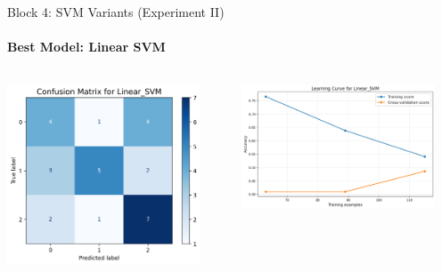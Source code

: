 \documentclass[9pt]{beamer}
\begin{document}
    \begin{frame}{Block 4: SVM Variants (Experiment II)}
    \framesubtitle{Best Model: Linear SVM}
    \begin{columns}
        \begin{column}{0.5\textwidth}
            \centering
            \includegraphics[width=0.9\textwidth]{code/ResultsMainAugZip/plots/Block4_SVM_Variants_Experiment_II/confusion_matrix_Linear_SVM.png}
        \end{column}
        \begin{column}{0.5\textwidth}
            \centering
            \includegraphics[width=0.9\textwidth]{code/ResultsMainAugZip/plots/Block4_SVM_Variants_Experiment_II/learning_curve_Linear_SVM.png}
        \end{column}
    \end{columns}
    \end{frame}
\end{document}
